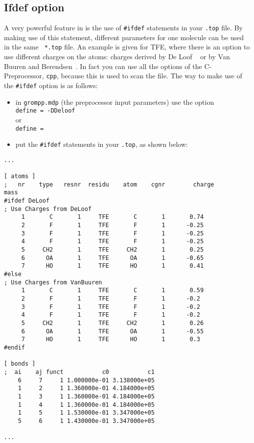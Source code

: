 \subsection{Ifdef option}
\label{subsec:ifdef}
A very powerful feature in {\gromacs} is the use of {\tt \#ifdef}
statements in your {\tt *.top} file. By making use of this statement,
different parameters for one molecule can be used in the same {\tt
*.top} file. An example is given for TFE, where there is an option to
use different charges on the atoms: charges derived by De Loof
{\etal}~\cite{Loof92} or by Van Buuren and
Berendsen~\cite{Buuren93a}. In fact you can use all the options of the
C-Preprocessor, {\tt cpp}, because this is used to scan the file.  The
way to make use of the {\tt \#ifdef} option is as follows:
\begin{itemize}
\item in {\tt grompp.mdp} (the {\gromacs} preprocessor input
      parameters) use the option\\{\tt define = -DDeloof}\\ or
      \\{\tt define = }
\item put the {\tt \#ifdef} statements in your {\tt *.top}, as
      shown below: 
\end{itemize}
{\small\begin{verbatim}
...

[ atoms ]
;   nr    type   resnr  residu    atom    cgnr        charge          mass
#ifdef DeLoof
; Use Charges from DeLoof
     1       C       1     TFE       C       1		 0.74
     2       F       1     TFE       F       1		-0.25
     3       F       1     TFE       F       1		-0.25
     4       F       1     TFE       F       1		-0.25
     5     CH2       1     TFE     CH2       1		 0.25
     6      OA       1     TFE      OA       1		-0.65
     7      HO       1     TFE      HO       1		 0.41
#else
; Use Charges from VanBuuren
     1       C       1     TFE       C       1		 0.59
     2       F       1     TFE       F       1		-0.2
     3       F       1     TFE       F       1		-0.2
     4       F       1     TFE       F       1		-0.2
     5     CH2       1     TFE     CH2       1		 0.26
     6      OA       1     TFE      OA       1		-0.55
     7      HO       1     TFE      HO       1		 0.3
#endif

[ bonds ]
;  ai    aj funct           c0           c1
    6     7     1 1.000000e-01 3.138000e+05 
    1     2     1 1.360000e-01 4.184000e+05 
    1     3     1 1.360000e-01 4.184000e+05 
    1     4     1 1.360000e-01 4.184000e+05 
    1     5     1 1.530000e-01 3.347000e+05 
    5     6     1 1.430000e-01 3.347000e+05 

...
\end{verbatim}}

